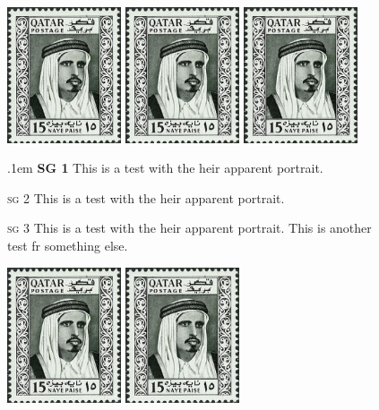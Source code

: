 \documentclass[justified]{tufte-book}
\begin{document}
\begin{figure}[hp]
\centering
\includegraphics[width=0.3\textwidth]{./graphics/qatar.jpg}
\includegraphics[width=0.3\textwidth]{./graphics/qatar.jpg}
\includegraphics[width=0.3\textwidth]{./graphics/qatar.jpg}
\parbox[t]{3.3cm}{\small\hangindent.1em \textsc{\textbf{SG 1}}  This is a test with the heir apparent portrait.} \parbox[t]{3.3cm}{\textsc{sg 2} \small This is a test with the heir apparent portrait.}\parbox[t]{3.3cm}{\textsc{sg 3} \small This is a test with the heir apparent portrait. This is another test fr something else.}


\vspace{4pt}
\includegraphics[width=0.3\textwidth]{./graphics/qatar.jpg}
\includegraphics[width=0.3\textwidth]{./graphics/qatar.jpg}


\end{figure}
\end{document}
